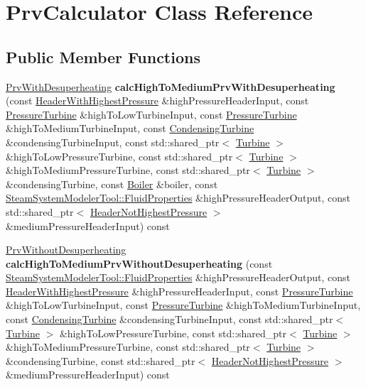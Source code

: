 \hypertarget{class_prv_calculator}{}\section{Prv\+Calculator Class Reference}
\label{class_prv_calculator}
\subsection*{Public Member Functions}
\begin{DoxyCompactItemize}
\item 
\mbox{\label{class_prv_calculator_a07b64cdc95d9a7fd980bdd586654ca22}} 
\hyperlink{class_prv_with_desuperheating}{Prv\+With\+Desuperheating} {\bfseries calc\+High\+To\+Medium\+Prv\+With\+Desuperheating} (const \hyperlink{class_header_with_highest_pressure}{Header\+With\+Highest\+Pressure} \&high\+Pressure\+Header\+Input, const \hyperlink{class_pressure_turbine}{Pressure\+Turbine} \&high\+To\+Low\+Turbine\+Input, const \hyperlink{class_pressure_turbine}{Pressure\+Turbine} \&high\+To\+Medium\+Turbine\+Input, const \hyperlink{class_condensing_turbine}{Condensing\+Turbine} \&condensing\+Turbine\+Input, const std\+::shared\+\_\+ptr$<$ \hyperlink{class_turbine}{Turbine} $>$ \&high\+To\+Low\+Pressure\+Turbine, const std\+::shared\+\_\+ptr$<$ \hyperlink{class_turbine}{Turbine} $>$ \&high\+To\+Medium\+Pressure\+Turbine, const std\+::shared\+\_\+ptr$<$ \hyperlink{class_turbine}{Turbine} $>$ \&condensing\+Turbine, const \hyperlink{class_boiler}{Boiler} \&boiler, const \hyperlink{struct_steam_system_modeler_tool_1_1_fluid_properties}{Steam\+System\+Modeler\+Tool\+::\+Fluid\+Properties} \&high\+Pressure\+Header\+Output, const std\+::shared\+\_\+ptr$<$ \hyperlink{class_header_not_highest_pressure}{Header\+Not\+Highest\+Pressure} $>$ \&medium\+Pressure\+Header\+Input) const
\item 
\mbox{\label{class_prv_calculator_a42c579ff96593bab8109610d557718c0}} 
\hyperlink{class_prv_without_desuperheating}{Prv\+Without\+Desuperheating} {\bfseries calc\+High\+To\+Medium\+Prv\+Without\+Desuperheating} (const \hyperlink{struct_steam_system_modeler_tool_1_1_fluid_properties}{Steam\+System\+Modeler\+Tool\+::\+Fluid\+Properties} \&high\+Pressure\+Header\+Output, const \hyperlink{class_header_with_highest_pressure}{Header\+With\+Highest\+Pressure} \&high\+Pressure\+Header\+Input, const \hyperlink{class_pressure_turbine}{Pressure\+Turbine} \&high\+To\+Low\+Turbine\+Input, const \hyperlink{class_pressure_turbine}{Pressure\+Turbine} \&high\+To\+Medium\+Turbine\+Input, const \hyperlink{class_condensing_turbine}{Condensing\+Turbine} \&condensing\+Turbine\+Input, const std\+::shared\+\_\+ptr$<$ \hyperlink{class_turbine}{Turbine} $>$ \&high\+To\+Low\+Pressure\+Turbine, const std\+::shared\+\_\+ptr$<$ \hyperlink{class_turbine}{Turbine} $>$ \&high\+To\+Medium\+Pressure\+Turbine, const std\+::shared\+\_\+ptr$<$ \hyperlink{class_turbine}{Turbine} $>$ \&condensing\+Turbine, const std\+::shared\+\_\+ptr$<$ \hyperlink{class_header_not_highest_pressure}{Header\+Not\+Highest\+Pressure} $>$ \&medium\+Pressure\+Header\+Input) const

\end{DoxyCompactItemize}
